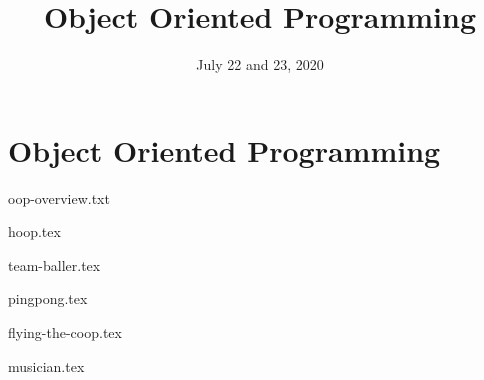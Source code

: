 \documentclass{exam}
\title{Object Oriented Programming }
\date{July 22 and 23, 2020}
\begin{document}
\maketitle

\section{Object Oriented Programming}

{oop-overview.txt}

\newpage
\begin{questions}
{hoop.tex}

{team-baller.tex}

{pingpong.tex}

{flying-the-coop.tex}

{musician.tex}

\end{questions}
\end{document}
